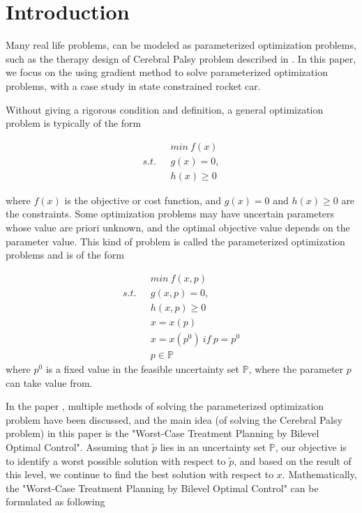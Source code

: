 

\section{Introduction}

Many real life problems, can be modeled as parameterized optimization problems, such as the therapy design of Cerebral Palsy problem described in \cite{MatSch22}. In this paper, we focus on the using gradient method to solve parameterized optimization problems, with a case study in state constrained rocket car. 

Without giving a rigorous condition and definition,  a general optimization problem is typically of the form

\begin{equation}
	\begin{aligned}
		 \  \  \ & min \  f(x) \\
		s.t.  \  \  \ & g(x) = 0, \\ 
		              &  h(x)  \geq  0 
	\end{aligned}
\end{equation}

where $f(x)$ is the objective or cost function, and $g(x) = 0$ and $h(x)  \geq  0$ are the constraints. Some optimization problems may have uncertain parameters whose value are priori unknown, and the optimal objective value depends on the parameter value. This kind of problem is called the parameterized optimization problems and is of the form 


\begin{equation}
	\begin{aligned}
		\  \  \ & min \  f(x, p) \\
		s.t.  \  \  \ & g(x, p) = 0, \\ 
		&  h(x,p)  \geq  0  \\ 
		& x = x(p) \\
		& x = x(p^0) \  if \  p = p^0 \\
		& p \in \mathbb{P}		
	\end{aligned}
\end{equation}
where $p^0$ is a fixed value in the feasible uncertainty set $\mathbb{P}$, where the parameter $p$ can take value from.

In the paper \cite{MatSch22}, multiple methods of solving the parameterized optimization problem have been discussed, and the main idea (of solving the  Cerebral Palsy problem) in this paper is the "Worst-Case Treatment Planning by Bilevel Optimal Control". Assuming that $\tilde{p}$ lies in an uncertainty set $\mathbb{P}$, our objective is to identify a worst possible solution with respect to $\tilde{p}$, and based on the result of this level, we continue to find the best solution with respect to $x$. Mathematically, the "Worst-Case Treatment Planning by Bilevel Optimal Control" can be formulated as following


